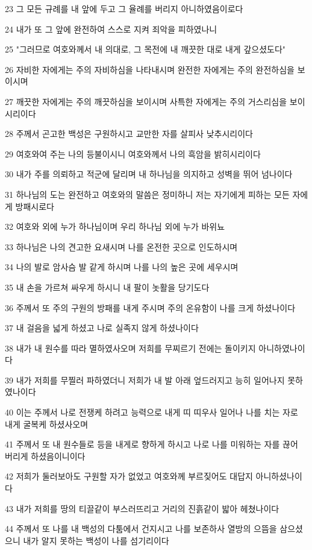 \par 23 그 모든 규례를 내 앞에 두고 그 율례를 버리지 아니하였음이로다
\par 24 내가 또 그 앞에 완전하여 스스로 지켜 죄악을 피하였나니
\par 25 "그러므로 여호와께서 내 의대로, 그 목전에 내 깨끗한 대로 내게 갚으셨도다"
\par 26 자비한 자에게는 주의 자비하심을 나타내시며 완전한 자에게는 주의 완전하심을 보이시며
\par 27 깨끗한 자에게는 주의 깨끗하심을 보이시며 사특한 자에게는 주의 거스리심을 보이시리이다
\par 28 주께서 곤고한 백성은 구원하시고 교만한 자를 살피사 낮추시리이다
\par 29 여호와여 주는 나의 등불이시니 여호와께서 나의 흑암을 밝히시리이다
\par 30 내가 주를 의뢰하고 적군에 달리며 내 하나님을 의지하고 성벽을 뛰어 넘나이다
\par 31 하나님의 도는 완전하고 여호와의 말씀은 정미하니 저는 자기에게 피하는 모든 자에게 방패시로다
\par 32 여호와 외에 누가 하나님이며 우리 하나님 외에 누가 바위뇨
\par 33 하나님은 나의 견고한 요새시며 나를 온전한 곳으로 인도하시며
\par 34 나의 발로 암사슴 발 같게 하시며 나를 나의 높은 곳에 세우시며
\par 35 내 손을 가르쳐 싸우게 하시니 내 팔이 놋활을 당기도다
\par 36 주께서 또 주의 구원의 방패를 내게 주시며 주의 온유함이 나를 크게 하셨나이다
\par 37 내 걸음을 넓게 하셨고 나로 실족지 않게 하셨나이다
\par 38 내가 내 원수를 따라 멸하였사오며 저희를 무찌르기 전에는 돌이키지 아니하였나이다
\par 39 내가 저희를 무찔러 파하였더니 저희가 내 발 아래 엎드러지고 능히 일어나지 못하였나이다
\par 40 이는 주께서 나로 전쟁케 하려고 능력으로 내게 띠 띠우사 일어나 나를 치는 자로 내게 굴복케 하셨사오며
\par 41 주께서 또 내 원수들로 등을 내게로 향하게 하시고 나로 나를 미워하는 자를 끊어 버리게 하셨음이니이다
\par 42 저희가 둘러보아도 구원할 자가 없었고 여호와께 부르짖어도 대답지 아니하셨나이다
\par 43 내가 저희를 땅의 티끌같이 부스러뜨리고 거리의 진흙같이 밟아 헤쳤나이다
\par 44 주께서 또 나를 내 백성의 다툼에서 건지시고 나를 보존하사 열방의 으뜸을 삼으셨으니 내가 알지 못하는 백성이 나를 섬기리이다
